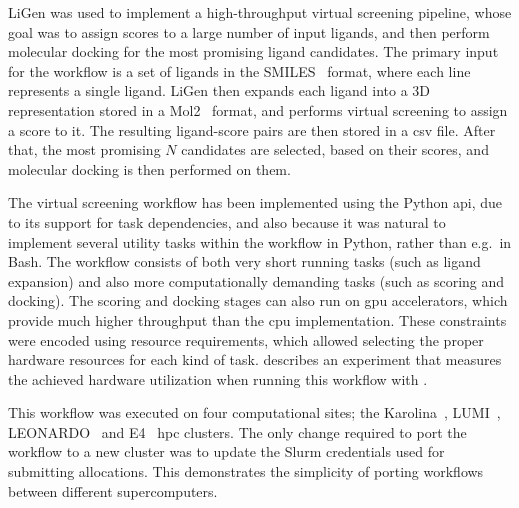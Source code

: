 

LiGen was used to implement a high-throughput virtual screening pipeline, whose goal was to assign
scores to a large number of input ligands, and then perform molecular docking for the most
promising ligand candidates. The primary input for the workflow is a set of ligands in the
SMILES~\cite{smiles} format, where each line represents a single ligand. LiGen then
expands each ligand into a 3D representation stored in a Mol2~\cite{mol2} format, and
performs virtual screening to assign a score to it. The resulting ligand-score pairs are then
stored in a \gls{csv} file. After that, the most promising $N$
candidates are selected, based on their scores, and molecular docking is then performed on them.

The virtual screening workflow has been implemented using the \hyperqueue{} Python
\gls{api}, due to its support for task dependencies, and also because it was natural
to implement several utility tasks within the workflow in Python, rather than e.g.\ in Bash. The
workflow consists of both very short running tasks (such as ligand expansion) and also more
computationally demanding tasks (such as scoring and docking). The scoring and docking stages can
also run on \gls{gpu} accelerators, which provide much higher throughput than the
\gls{cpu} implementation. These constraints were encoded using
\hq{} resource requirements, which allowed selecting the proper hardware
resources for each kind of task.  describes an experiment that measures the
achieved hardware utilization when running this workflow with \hyperqueue{}.

This workflow was executed on four computational sites; the Karolina~\cite{karolina},
LUMI~\cite{lumi}, LEONARDO~\cite{leonardo} and E4~\cite{e4}
\gls{hpc} clusters. The only change required to port the workflow to a new cluster
was to update the Slurm credentials used for submitting allocations. This demonstrates the
simplicity of porting \hyperqueue{} workflows between different supercomputers.

